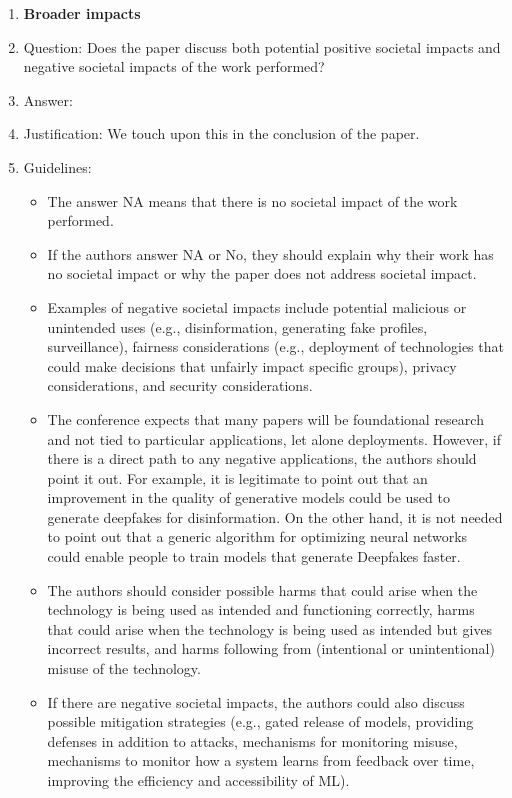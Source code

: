 \documentclass{article}
\theoremstyle{plain}
\theoremstyle{definition}
\theoremstyle{remark}
\begin{document}
\begin{enumerate}
\item {\bf Broader impacts}
    \item[] Question: Does the paper discuss both potential positive societal impacts and negative societal impacts of the work performed?
    \item[] Answer: \answerYes{} %
    \item[] Justification: We touch upon this in the conclusion of the paper.
    \item[] Guidelines:
    \begin{itemize}
        \item The answer NA means that there is no societal impact of the work performed.
        \item If the authors answer NA or No, they should explain why their work has no societal impact or why the paper does not address societal impact.
        \item Examples of negative societal impacts include potential malicious or unintended uses (e.g., disinformation, generating fake profiles, surveillance), fairness considerations (e.g., deployment of technologies that could make decisions that unfairly impact specific groups), privacy considerations, and security considerations.
        \item The conference expects that many papers will be foundational research and not tied to particular applications, let alone deployments. However, if there is a direct path to any negative applications, the authors should point it out. For example, it is legitimate to point out that an improvement in the quality of generative models could be used to generate deepfakes for disinformation. On the other hand, it is not needed to point out that a generic algorithm for optimizing neural networks could enable people to train models that generate Deepfakes faster.
        \item The authors should consider possible harms that could arise when the technology is being used as intended and functioning correctly, harms that could arise when the technology is being used as intended but gives incorrect results, and harms following from (intentional or unintentional) misuse of the technology.
        \item If there are negative societal impacts, the authors could also discuss possible mitigation strategies (e.g., gated release of models, providing defenses in addition to attacks, mechanisms for monitoring misuse, mechanisms to monitor how a system learns from feedback over time, improving the efficiency and accessibility of ML).
    \end{itemize}
    

\end{enumerate}
\end{document}
